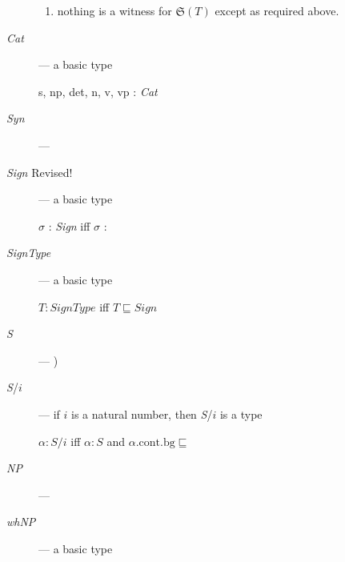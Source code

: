 \begin{description}
\begin{enumerate}
  \item nothing is a witness for $\mathfrak{S}(T)$ except as required above.
 
  \end{enumerate}

  
  

      
    \item[\textnormal{\textit{Cat}}] --- a basic type

      s, np, det, n, v, vp : \textit{Cat}

    
    \item[\textnormal{\textit{Syn}}] ---   
 


  
    \item[\textnormal{\textit{Sign}} Revised!] ---  a basic type

      $\sigma$ : \textit{Sign} iff $\sigma$ :

  
\item[\textnormal{\textit{SignType}}] --- a basic type

  $T:\textit{SignType}$ iff $T\sqsubseteq\textit{Sign}$ 

  
\item[\textnormal{\textit{S}}] --- 
  )
  
\item[\textnormal{\textit{S}/$i$}] --- if $i$ is a natural
  number, then \textit{S}/$i$ is a type

  $\alpha:\textit{S}/i$ iff $\alpha:\textit{S}$ and $\alpha.\text{cont}.\text{bg}\sqsubseteq$ 
  
  
\item[\textnormal{\textit{NP}}] --- 
  
\item[\textnormal{\textit{whNP}}] --- a basic type


\end{description}
